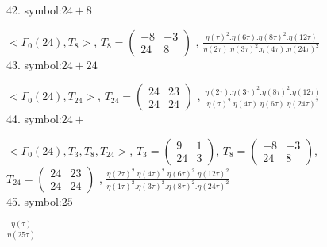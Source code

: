 42. symbol:$ 24+8 $

$ < \Gamma_0 ( 24 ), T_8 >  $,
$
T_8 = 
\left(
\begin{array}{cc}
-8 & -3 \\
24 & 8
\end{array}
\right)
$
, {$ \frac{\eta(\tau)^2 . \eta(6\tau) .\eta(8\tau)^2 .\eta(12\tau)}{\eta(2\tau) . \eta(3\tau)^2 .\eta(4\tau) .\eta(24\tau)^2} $}
\\

43. symbol:$ 24+24 $

$ < \Gamma_0 ( 24 ), T_{24} >  $,
$
T_{24} = 
\left(
\begin{array}{cc}
24 & 23 \\
24 & 24
\end{array}
\right)
$
, {$ \frac{\eta(2\tau) . \eta(3\tau)^2 .\eta(8\tau)^2 .\eta(12\tau)}{\eta(\tau)^2 . \eta(4\tau) .\eta(6\tau) .\eta(24\tau)^2} $}
\\

44. symbol:$ 24+ $

$ < \Gamma_0 ( 24 ), T_3, T_8, T_{24} >  $,
$
T_3 = 
\left(
\begin{array}{cc}
9 & 1 \\
24 & 3
\end{array}
\right)
$,
$
T_8 = 
\left(
\begin{array}{cc}
-8 & -3 \\
24 & 8
\end{array}
\right)
$,
$
T_{24} = 
\left(
\begin{array}{cc}
24 & 23 \\
24 & 24
\end{array}
\right)
$
, {$ \frac{\eta(2\tau)^2 . \eta(4\tau)^2 .\eta(6\tau)^2 .\eta(12\tau)^2}{\eta(1\tau)^2 . \eta(3\tau)^2 .\eta(8\tau)^2 .\eta(24\tau)^2} $}
\\

45. symbol:$ 25- $

 {$ \frac{\eta(\tau)}{\eta(25\tau)} $}
\\